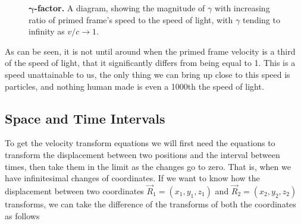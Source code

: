 \begin{figure}[H]
	\centering
	\caption{$\boldsymbol{\gamma}$\textbf{-factor.} A diagram, showing the magnitude of $\gamma$ with increasing ratio of primed frame's speed to the speed of light, with ${\gamma}$ tending to infinity as ${v}/{c}\rightarrow 1$.}
	\label{fig: Gamma Factor}
\end{figure}

As can be seen, it is not until around when the primed frame velocity is a third of the speed of light, that it significantly differs from being equal to 1.
This is a speed unattainable to us, the only thing we can bring up close to this speed is particles, and nothing human made is even a 1000th the speed of light.

\subsection{Space and Time Intervals} \label{subsect: Space and Time Intervals}

To get the velocity transform equations we will first need the equations to transform the displacement between two positions and the interval between times, then take them in the limit as the changes go to zero.
That is, when we have infinitesimal changes of coordinates.
If we want to know how the displacement between two coordinates ${\vec{R}_1} = (x_1,y_1,z_1)$ and ${\vec{R}_2} = (x_2,y_2,z_2)$ transforms, we can take the difference of the transforms of both the coordinates as follows

